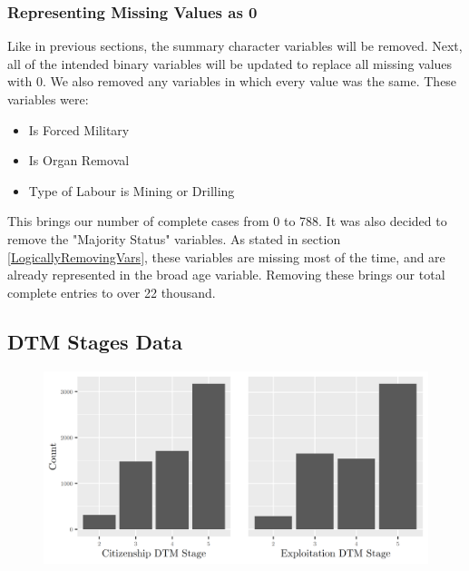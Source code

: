 \documentclass{article} %
\begin{document}
\subsubsection{Representing Missing Values as 0}

Like in previous sections, the summary character variables will be removed. Next, all of the intended binary variables will be updated to replace all missing values with 0. We also removed any variables in which every value was the same. These variables were:

\begin{multicols}{3}
	\begin{itemize}
		\item Is Forced Military
		\item Is Organ Removal
		\item Type of Labour is Mining or Drilling
	\end{itemize}
\end{multicols}

This brings our number of complete cases from 0 to 788. It was also decided to remove the "Majority Status" variables. As stated in section \ref{LogicallyRemovingVars}, these variables are missing most of the time, and are already represented in the broad age variable. Removing these brings our total complete entries to over 22 thousand. 



\subsection{DTM Stages Data}

\FloatBarrier
\begin{figure}[H]
	\includegraphics[width=\textwidth]{DTMStagesBarplot}
\end{figure}
\FloatBarrier
\end{document}
